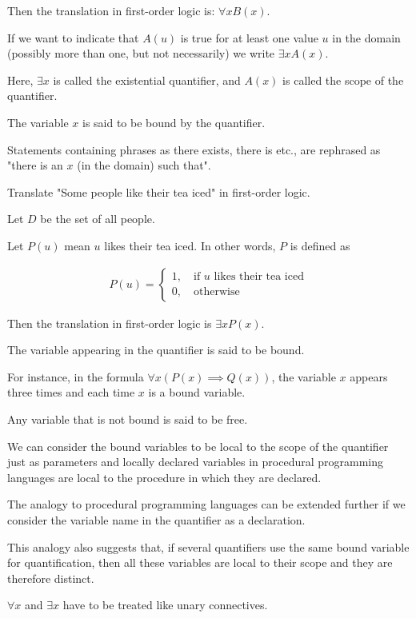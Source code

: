 \documentclass{article}
\begin{document}
Then the translation in first-order logic is: $\forall x B(x)$.

If we want to indicate that $A(u)$ is true for at least one value $u$ in the domain (possibly more than one, but not necessarily) we write $\exists x A(x)$.

Here, $\exists x$ is called the existential quantifier, and $A(x)$ is called the scope of the quantifier.

The variable $x$ is said to be bound by the quantifier.

Statements containing phrases as there exists, there is etc., are rephrased as "there is an $x$ (in the domain) such that". 

Translate "Some people like their tea iced" in first-order logic.

Let $D$ be the set of all people.

Let $P(u)$ mean $u$ likes their tea iced. In other words, $P$ is defined as

\begin{align*}
P(u) = \begin{cases}
1, \quad \text{if } u \text{ likes their tea iced} \\
0, \quad \text{otherwise}
\end{cases}
\end{align*}

Then the translation in first-order logic is $\exists x P(x)$.

The variable appearing in the quantifier is said to be bound.

For instance, in the formula $\forall x(P(x) \implies Q(x))$, the variable $x$ appears three times and each time $x$ is a bound variable.

Any variable that is not bound is said to be free.

We can consider the bound variables to be local to the scope of the quantifier just as parameters and locally declared variables in procedural programming languages are local to the procedure in which they are declared.

The analogy to procedural programming languages can be extended further if we consider the variable name in the quantifier as a declaration.

This analogy also suggests that, if several quantifiers use the same bound variable for quantification, then all these variables are local to their scope and they are therefore distinct.

$\forall x$ and $\exists x$ have to be treated like unary connectives.
\end{document}
